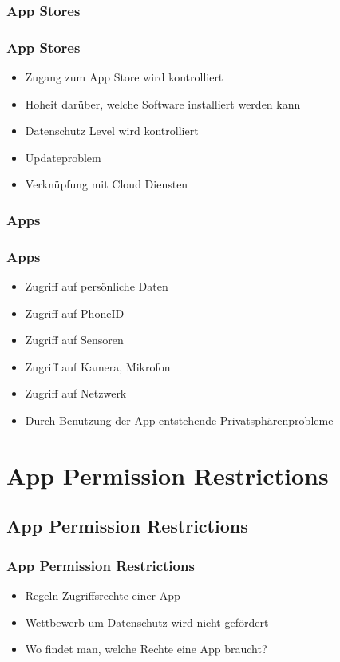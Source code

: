 \documentclass[12pt]{beamer}
\begin{document}
\subsubsection{App Stores}
\begin{frame}
	\frametitle{App Stores}
	\begin{itemize}
		\item Zugang zum App Store wird kontrolliert
		\item Hoheit darüber, welche Software installiert werden kann
		\item Datenschutz Level wird kontrolliert
		\item Updateproblem
		\item Verknüpfung mit Cloud Diensten
	\end{itemize}
\end{frame}

\subsubsection{Apps}
\begin{frame}
	\frametitle{Apps}
	\begin{itemize}
		\item Zugriff auf persönliche Daten
		\item Zugriff auf PhoneID
		\item Zugriff auf Sensoren
		\item Zugriff auf Kamera, Mikrofon
		\item Zugriff auf Netzwerk
		\item Durch Benutzung der App entstehende Privatsphärenprobleme
	\end{itemize}
\end{frame}

\section{App Permission Restrictions}
\subsection{App Permission Restrictions}
\begin{frame}
	\frametitle{App Permission Restrictions}
	\begin{itemize}
		\item Regeln Zugriffsrechte einer App
		\item Wettbewerb um Datenschutz wird nicht gefördert
		\item Wo findet man, welche Rechte eine App braucht?
	\end{itemize}
\end{frame}
\end{document}
